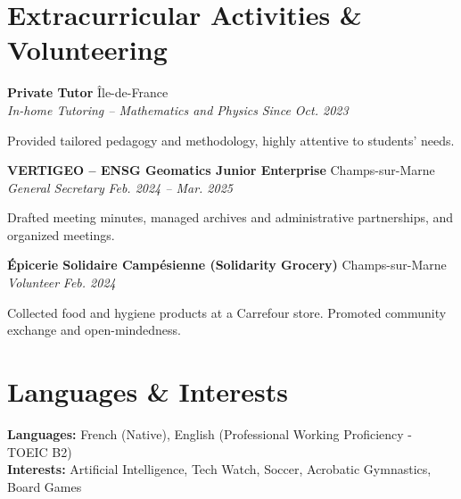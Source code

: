 \documentclass[11pt, a4paper]{article}
\newcommand{\cventry}[4]{
    \vspace{0.1cm}
    \noindent \textbf{#1} \hfill #2 \\
    \noindent \textit{#3} \hfill \textit{#4} \par
    \vspace{0.05cm}
}
\begin{document}
\section*{Extracurricular Activities \& Volunteering}

\cventry{Private Tutor}{Île-de-France}{In-home Tutoring -- Mathematics and Physics}{Since Oct. 2023}
\noindent Provided tailored pedagogy and methodology, highly attentive to students' needs.

\cventry{VERTIGEO -- ENSG Geomatics Junior Enterprise}{Champs-sur-Marne}{General Secretary}{Feb. 2024 -- Mar. 2025}
\noindent Drafted meeting minutes, managed archives and administrative partnerships, and organized meetings.

\cventry{Épicerie Solidaire Campésienne (Solidarity Grocery)}{Champs-sur-Marne}{Volunteer}{Feb. 2024}
\noindent Collected food and hygiene products at a Carrefour store. Promoted community exchange and open-mindedness.

\section*{Languages \& Interests}
\noindent \textbf{Languages:} French (Native), English (Professional Working Proficiency - TOEIC B2) \\[0.1cm]
\textbf{Interests:} Artificial Intelligence, Tech Watch, Soccer, Acrobatic Gymnastics, Board Games
\end{document}

